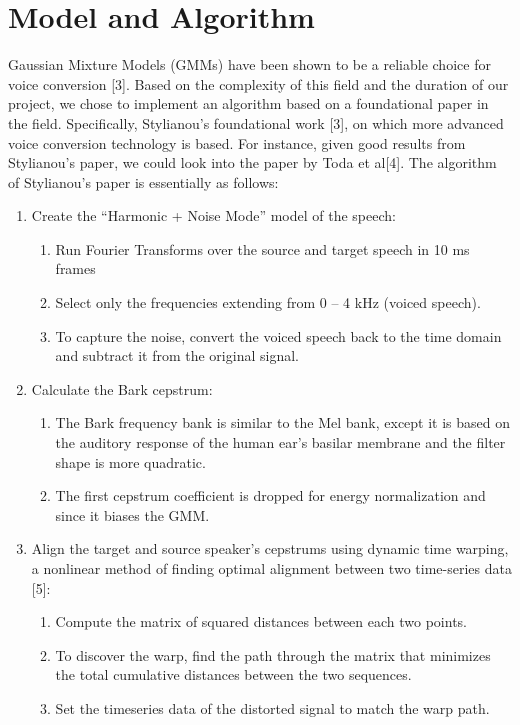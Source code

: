 \documentclass{article}
\begin{document}
\section{Model and Algorithm}
Gaussian Mixture Models (GMMs) have been shown to be a reliable choice for voice conversion [3]. Based on the complexity of this field and the duration of our project, we chose to implement an algorithm based on a foundational paper in the field. Specifically, Stylianou's foundational work [3], on which more advanced voice conversion technology is based. For instance, given good results from Stylianou's paper, we could look into the paper by Toda et al[4].  The algorithm of Stylianou's paper is essentially as follows:
\begin{enumerate}
\item Create the ``Harmonic + Noise Mode'' model of the speech:
\begin{enumerate}
\item Run Fourier Transforms over the source and target speech in 10 ms frames
\item Select only the frequencies extending from 0 -- 4 kHz (voiced speech).
\item To capture the noise, convert the voiced speech back to the time domain and subtract it from the original signal.
\end{enumerate}

\item Calculate the Bark cepstrum:
\begin{enumerate}
\item The Bark frequency bank is similar to the Mel bank, except it is based on the auditory response of the human ear's basilar membrane and the filter shape is more quadratic.
\item The first cepstrum coefficient is dropped for energy normalization and since it biases the GMM.
\end{enumerate}

\item Align the target and source speaker's cepstrums using dynamic time warping, a nonlinear method of finding optimal alignment between two time-series data [5]:
\begin{enumerate}
\item Compute the matrix of squared distances between each two points.
\item To discover the warp, find the path through the matrix that minimizes the total cumulative distances between the two sequences.
\item Set the timeseries data of the distorted signal to match the warp path.
\end{enumerate}


\end{enumerate}
\end{document}
